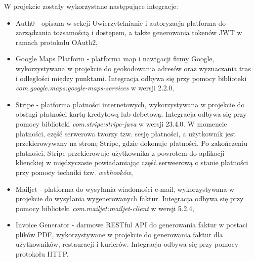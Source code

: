 W projekcie zostały wykorzystane następujące integracje:

\begin{itemize}

    \item Auth0 \cite{auth0} - opisana w sekcji Uwierzytelnianie i autoryzacja platforma do zarządzania tożsamością i dostępem, a także generowania tokenów JWT w ramach protokołu OAuth2,
    \item Google Maps Platform \cite{gmaps} - platforma map i nawigacji firmy Google, wykorzystywana w projekcie do geokodowania adresów oraz wyznaczania tras i odległości między punktami. Integracja odbywa się przy pomocy biblioteki \newline \textit{com.google.maps:google-maps-services} w wersji 2.2.0,
    \item Stripe \cite{stripe} - platforma płatności internetowych, wykorzystywana w projekcie do obsługi płatności kartą kredytową lub debetową. Integracja odbywa się przy pomocy biblioteki \textit{com.stripe:stripe-java} w wersji 23.4.0. W momencie płatności, część serwerowa tworzy tzw. sesję płatności, a użytkownik jest przekierowywany na stronę Stripe, gdzie dokonuje płatności. Po zakończeniu płatności, Stripe przekierowuje użytkownika z powrotem do aplikacji klienckiej w międzyczasie powiadamiając część serweerową o stanie płatności przy pomocy techniki tzw. \textit{webhooków},
    \item Mailjet \cite{mailjet} - platforma do wysyłania wiadomości e-mail, wykorzystywana w projekcie do wysyłania wygenerowanych faktur. Integracja odbywa się przy pomocy biblioteki \textit{com.mailjet:mailjet-client} w wersji 5.2.4,
    \item Invoice Generator \cite{invoicegenerator} - darmowe RESTful API do generowania faktur w postaci plików PDF, wykorzystywane w projekcie do generowania faktur dla użytkowników, restauracji i kurierów. Integracja odbywa się przy pomocy protokołu HTTP.

\end{itemize}